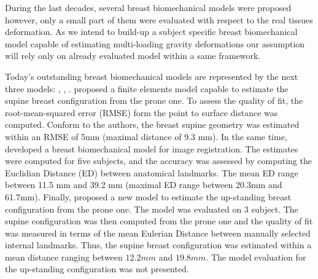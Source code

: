  During the last decades, several breast biomechanical models were proposed however, only a small part of them \citep{carter_biomechanical_2009,gamage_modelling_2012,han_nonlinear_2014} were evaluated with respect to the real tissues deformation. As we intend to build-up a subject specific breast biomechanical model capable of estimating multi-loading gravity deformations our assumption will rely only on already evaluated model within a same framework.
 
Today's outstanding breast biomechanical models are represented by the next three models:   \cite{eiben_surface_2016}, \cite{han_nonlinear_2014}, \cite{gamage_modelling_2012}.  \cite{gamage_modelling_2012} proposed a finite elements model capable to estimate the supine breast configuration from the prone one. To assess the quality of fit, the root-mean-squared error (RMSE) form the point to surface distance was computed.  Conform to the authors, the breast supine geometry was estimated within an RMSE of 5mm (maximal distance of 9.3 mm).  In the same time, \cite{han_nonlinear_2014} developed a breast biomechanical model for image registration. The estimates were computed for five subjects, and the accuracy was assessed by computing the Euclidian Distance (ED) between anatomical landmarks.  The mean ED range between 11.5 mm and 39.2 mm (maximal ED range between 20.3mm and 61.7mm).  Finally, \cite{eiben_surface_2016} proposed a new model to estimate the up-standing breast configuration from the prone one. The model was evaluated on 3 subject. The supine configuration was then computed from the prone one and the quality of fit was measured in terms of the mean Eulerian Distance between manually selected internal landmarks. Thus, the supine breast configuration was estimated within a mean distance ranging between $12.2mm$ and $19.8 mm$. The model evaluation for the up-standing configuration was not presented.   
 
 
